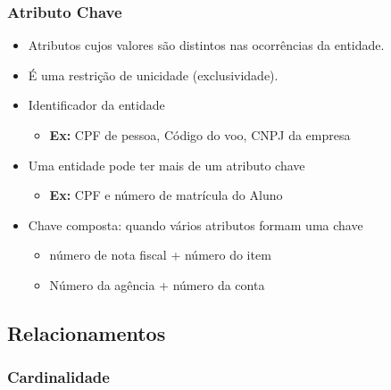 \documentclass[12pt,a4paper]{article}
\begin{document}
\newpage %

\subsubsection{Atributo Chave}

\begin{itemize}
    \item Atributos cujos valores são distintos nas ocorrências da entidade.
    \item É uma restrição de unicidade (exclusividade).
    \item Identificador da entidade
        \begin{itemize}
            \item \textbf{Ex:} CPF de pessoa, Código do voo, CNPJ da empresa
        \end{itemize}
    \item Uma entidade pode ter mais de um atributo chave
        \begin{itemize}
            \item \textbf{Ex:} CPF e número de matrícula do Aluno
        \end{itemize}
    \item Chave composta: quando vários atributos formam uma chave
        \begin{itemize}
            \item número de nota fiscal + número do item
            \item Número da agência + número da conta
        \end{itemize}
\end{itemize}

\subsection{Relacionamentos}

\subsubsection{Cardinalidade}
\end{document}
